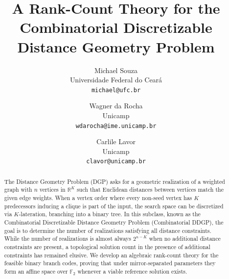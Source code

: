 \documentclass[11pt]{article}
\title{A Rank-Count Theory for the Combinatorial Discretizable Distance Geometry Problem}
\author{
Michael Souza\\
Universidade Federal do Cear\'a\\
\texttt{michael@ufc.br}
\and
Wagner da Rocha\\
Unicamp\\
\texttt{wdarocha@ime.unicamp.br}
\and
Carlile Lavor\\
Unicamp\\
\texttt{clavor@unicamp.br}
}
\date{}
\theoremstyle{plain}
\theoremstyle{definition}
\begin{document}
\maketitle

\begin{abstract}
The Distance Geometry Problem (DGP) asks for a geometric realization of a weighted graph with \(n\) vertices in \(\mathbb{R}^K\) such that Euclidean distances between vertices match the given edge weights. When a vertex order where every non-seed vertex has \(K\) predecessors inducing a clique is part of the input, the search space can be discretized via \(K\)-lateration, branching into a binary tree. In this subclass, known as the Combinatorial Discretizable Distance Geometry Problem (Combinatorial DDGP), the goal is to determine the number of realizations satisfying all distance constraints. While the number of realizations is almost always \(2^{n-K}\) when no additional distance constraints are present, a topological solution count in the presence of additional constraints has remained elusive. We develop an algebraic rank-count theory for the feasible binary branch codes, proving that under mirror-separated parameters they form an affine space over \(\mathbb{F}_2\) whenever a viable reference solution exists.
\end{abstract}












\end{document}
